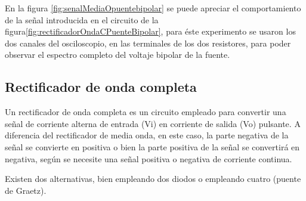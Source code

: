 En la figura \ref{fig:senalMediaOpuentebipolar} se puede apreciar el comportamiento de la señal introducida en el circuito de la figura\ref{fig:rectificadorOndaCPuenteBipolar}, para éste experimento se usaron los dos canales del osciloscopio, en las terminales de los dos resistores, para poder observar el espectro completo del voltaje bipolar de la fuente.\\


\subsection{Rectificador de onda completa}

Un rectificador de onda completa es un circuito empleado para convertir una señal de corriente alterna de entrada (Vi) en corriente de salida (Vo) pulsante. A diferencia del rectificador de media onda, en este caso, la parte negativa de la señal se convierte en positiva o bien la parte positiva de la señal se convertirá en negativa, según se necesite una señal positiva o negativa de corriente continua.

Existen dos alternativas, bien empleando dos diodos o empleando cuatro (puente de Graetz).\citep{circuitoOnda}